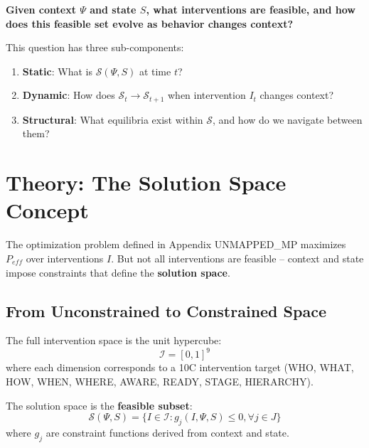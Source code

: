 \begin{tcolorbox}[colback=yellow!10, colframe=orange!75!black, title=Fundamental Question]
\textbf{Given context $\Psi$ and state $S$, what interventions are feasible, and how does this feasible set evolve as behavior changes context?}

This question has three sub-components:
\begin{enumerate}
    \item \textbf{Static}: What is $\mathcal{S}(\Psi, S)$ at time $t$?
    \item \textbf{Dynamic}: How does $\mathcal{S}_t \to \mathcal{S}_{t+1}$ when intervention $I_t$ changes context?
    \item \textbf{Structural}: What equilibria exist within $\mathcal{S}$, and how do we navigate between them?
\end{enumerate}
\end{tcolorbox}

\section{Theory: The Solution Space Concept}
\label{sec:ss-theory}

The optimization problem defined in Appendix UNMAPPED_MP maximizes $P_{eff}$ over interventions $I$. But not all interventions are feasible -- context and state impose constraints that define the \textbf{solution space}.

\subsection{From Unconstrained to Constrained Space}

The full intervention space is the unit hypercube:
\begin{equation}
\mathcal{I} = [0,1]^9
\end{equation}
where each dimension corresponds to a 10C intervention target (WHO, WHAT, HOW, WHEN, WHERE, AWARE, READY, STAGE, HIERARCHY).

The solution space is the \textbf{feasible subset}:
\begin{equation}
\mathcal{S}(\Psi, S) = \{I \in \mathcal{I} : g_j(I, \Psi, S) \leq 0, \forall j \in J\}
\end{equation}
where $g_j$ are constraint functions derived from context and state.

